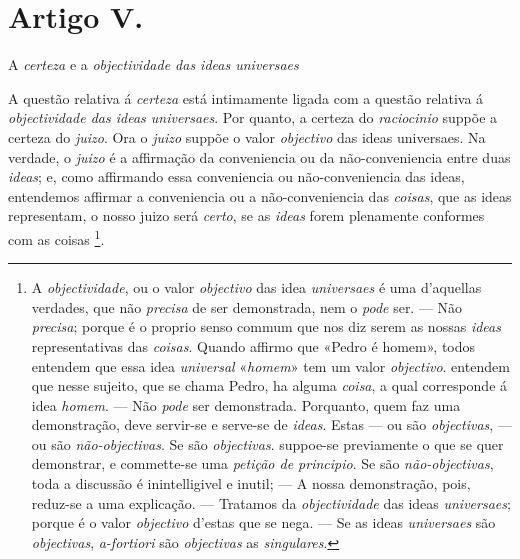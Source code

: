 \section*{Artigo V.}

A \emph{certeza} e a \emph{objectividade das ideas universaes}


A questão relativa á \emph{certeza} está intimamente ligada com a questão relativa á \emph{objectividade das ideas universaes}. Por quanto, a certeza do \emph{raciocinio} suppõe a certeza do \emph{juizo}. Ora o \emph{juizo} suppõe o valor \emph{objectivo} das ideas universaes. Na verdade, o \emph{juizo} é a affirmação da conveniencia ou da não-conveniencia entre duas \emph{ideas}; e, como affirmando essa conveniencia ou não-conveniencia das ideas, entendemos affirmar a conveniencia ou a não-conveniencia   das \emph{coisas}, que as ideas representam, o nosso juizo será \emph{certo}, se as \emph{ideas} forem plenamente conformes com as coisas \footnote{A \emph{objectividade}, ou o valor \emph{objectivo} das idea \emph{universaes} é uma d'aquellas verdades, que não \emph{precisa} de ser demonstrada, nem o \emph{pode} ser. --- Não \emph{precisa}; porque é o proprio senso commum que nos diz serem as nossas \emph{ideas} representativas das \emph{coisas}. Quando affirmo que «Pedro é homem», todos entendem que essa idea \emph{universal} «\emph{homem}» tem um valor \emph{objectivo}. entendem que nesse sujeito, que se chama Pedro, ha alguma \emph{coisa}, a qual corresponde á idea \emph{homem}. --- Não \emph{pode} ser demonstrada. Porquanto, quem faz uma demonstração, deve servir-se e serve-se de \emph{ideas}. Estas --- ou são \emph{objectivas}, --- ou são \emph{não-objectivas}. Se são \emph{objectivas}. suppoe-se previamente o que se quer demonstrar, e commette-se uma \emph{petição de principio}. Se são \emph{não-objectivas}, toda a discussão é inintelligivel e inutil; --- A nossa demonstração, pois, reduz-se a uma explicação. --- Tratamos da \emph{objectividade} das ideas \emph{universaes}; porque é o valor \emph{objectivo} d'estas que se nega. --- Se as ideas \emph{universaes} são \emph{objectivas}, \emph{a-fortiori} são \emph{objectivas} as \emph{singulares}.}.


